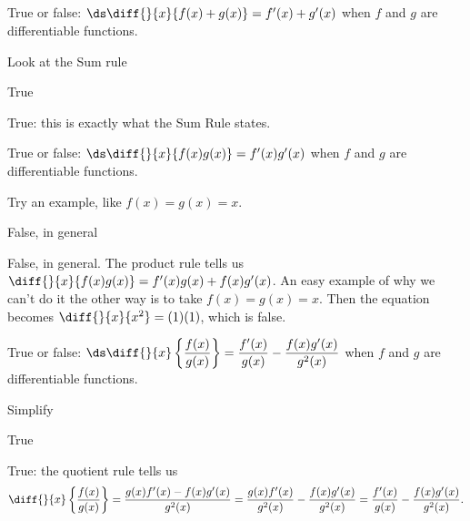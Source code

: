 %
%
\subsection*{\Conceptual}



\begin{question}True or false: $\ds\diff{}{x}\{f(x)+g(x)\}=f'(x)+g'(x)$ when $f$ and $g$ are differentiable functions.
\end{question}
\begin{hint} Look at the Sum rule
\end{hint}
\begin{answer} True
\end{answer}
\begin{solution} True: this is exactly what the Sum Rule states.
\end{solution}


\begin{question}
True or false: $\ds\diff{}{x}\{f(x)g(x)\}=f'(x)g'(x)$ when $f$ and $g$ are differentiable functions.
\end{question}
\begin{hint} Try an example, like $f(x)=g(x)=x$.
\end{hint}
\begin{answer} False, in general
\end{answer}
\begin{solution} False, in general. The product rule tells us $\diff{}{x}\{f(x)g(x)\}=f'(x)g(x)+f(x)g'(x)$. An easy example of why we can't do it the other way is to take $f(x)=g(x)=x$. Then the equation becomes $\diff{}{x}\{x^2\}=(1)(1)$, which is false.
\end{solution}


\begin{question}True or false: $\ds\diff{}{x}\left\{\dfrac{f(x)}{g(x)}\right\}=\dfrac{f'(x)}{g(x)}-\dfrac{f(x)g'(x)}{g^2(x)}$ when $f$ and $g$ are differentiable functions.
\end{question}
\begin{hint} Simplify
\end{hint}
\begin{answer} True
\end{answer}
\begin{solution} True: the quotient rule tells us \[\diff{}{x}\left\{\frac{f(x)}{g(x)}\right\}=\frac{g(x)f'(x)-f(x)g'(x)}{g^2(x)} = \frac{g(x)f'(x)}{g^2(x)}-\frac{f(x)g'(x)}{g^2(x)} = \frac{f'(x)}{g(x)}-\frac{f(x)g'(x)}{g^2(x)}.\]
\end{solution}


